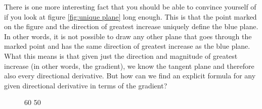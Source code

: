 \documentclass{myarticle}
\theoremstyle{nospace}
\newtheorem{old series theorem}{Theorem}
\newenvironment{series theorem}
{\begin{mdframed}\begin{old series theorem}}
    {\end{old series theorem}\end{mdframed}}
\begin{document}
There is one more interesting fact that you should be able to convince
yourself of if you look at figure \ref{fig:unique plane} long enough.
This is that the point marked on the figure and the direction of
greatest increase uniquely define the blue plane. In other words, it
is not possible to draw any other plane that goes through the marked
point and has the same direction of greatest increase as the blue
plane. What this means is that given just the direction and magnitude
of greatest increase (in other words, the gradient), we know the
tangent plane and therefore also every directional derivative. But how
can we find an explicit formula for any given directional derivative
in terms of the gradient?

\begin{figure}[htb!] \centering

  \tdplotsetmaincoords
  {60} %
  {50} %


\end{figure}
\end{document}

